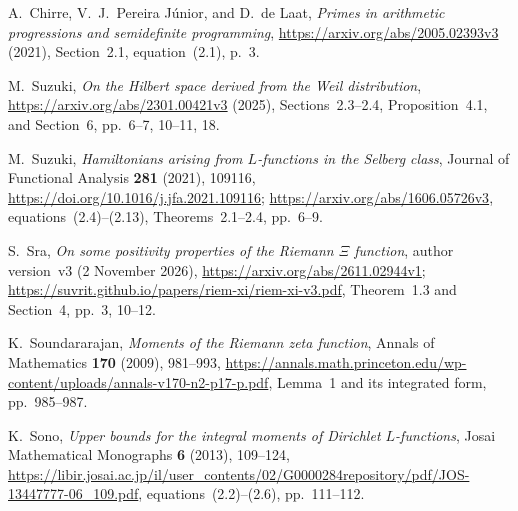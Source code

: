 A.~Chirre, V.~J.~Pereira J\'unior, and D.~de Laat,
\emph{Primes in arithmetic progressions and semidefinite programming},
\url{https://arxiv.org/abs/2005.02393v3} (2021),
Section~2.1, equation~(2.1), p.~3.

M.~Suzuki, \emph{On the Hilbert space derived from the Weil distribution},
\url{https://arxiv.org/abs/2301.00421v3} (2025),
Sections~2.3--2.4, Proposition~4.1, and Section~6,
pp.~6--7, 10--11, 18.

M.~Suzuki, \emph{Hamiltonians arising from $L$-functions in the Selberg class},
Journal of Functional Analysis \textbf{281} (2021), 109116,
\url{https://doi.org/10.1016/j.jfa.2021.109116};
\url{https://arxiv.org/abs/1606.05726v3},
equations~(2.4)--(2.13), Theorems~2.1--2.4, pp.~6--9.

S.~Sra, \emph{On some positivity properties of the Riemann $\Xi$ function},
author version~v3 (2 November 2026),
\url{https://arxiv.org/abs/2611.02944v1};
\url{https://suvrit.github.io/papers/riem-xi/riem-xi-v3.pdf},
Theorem~1.3 and Section~4, pp.~3, 10--12.


K.~Soundararajan, \emph{Moments of the Riemann zeta function},
Annals of Mathematics \textbf{170} (2009), 981--993,
\url{https://annals.math.princeton.edu/wp-content/uploads/annals-v170-n2-p17-p.pdf},
Lemma~1 and its integrated form, pp.~985--987.

K.~Sono, \emph{Upper bounds for the integral moments of Dirichlet
$L$-functions}, Josai Mathematical Monographs \textbf{6} (2013),
109--124, \url{https://libir.josai.ac.jp/il/user_contents/02/G0000284repository/pdf/JOS-13447777-06_109.pdf},
equations~(2.2)--(2.6), pp.~111--112.
